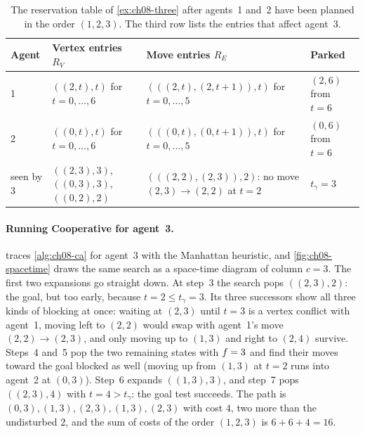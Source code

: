 \begin{table}[tb]
  \centering\small
  \caption{The reservation table of \cref{ex:ch08-three} after agents~1 and~2 have been
  planned in the order $(1,2,3)$. The third row lists the entries that affect agent~3.}
  \label{tab:ch08-table}
  \begin{tabular}{@{}lL{5.2cm}L{4.6cm}l@{}}
  \toprule
  Agent & Vertex entries $R_V$ & Move entries $R_E$ & Parked \\
   & $((2,t), t)$ for $t = 0, \dots, 6$ & $(((2,t),(2,t{+}1)), t)$ for $t = 0, \dots, 5$ & $(2,6)$ from $t = 6$ \\
  2 & $((0,t), t)$ for $t = 0, \dots, 6$ & $(((0,t),(0,t{+}1)), t)$ for $t = 0, \dots, 5$ & $(0,6)$ from $t = 6$ \\
  \midrule
  seen by 3 & $((2,3), 3)$, $((0,3), 3)$, $((0,2), 2)$ & $(((2,2),(2,3)), 2)$: no move $(2,3) \to (2,2)$ at $t = 2$ & $t_\gamma = 3$ \\
  \bottomrule
  \end{tabular}
\end{table}

\paragraph{Running Cooperative \astar for agent~3.}  traces
\cref{alg:ch08-ca} for agent~3 with the Manhattan heuristic, and
\cref{fig:ch08-spacetime} draws the same search as a space-time diagram of column
$c = 3$. The first two expansions go straight down. At step~3 the search pops
$((2,3), 2)$: the goal, but too early, because $t = 2 \le t_\gamma = 3$. Its three
successors show all three kinds of blocking at once: waiting at $(2,3)$ until $t = 3$
is a vertex conflict with agent~1, moving left to $(2,2)$ would swap with agent~1's
move $(2,2) \to (2,3)$, and only moving up to $(1,3)$ and right to $(2,4)$ survive.
Steps~4 and~5 pop the two remaining states with $f = 3$ and find their moves
toward the goal blocked as well (moving up from $(1,3)$ at $t = 2$ runs into agent~2 at $(0,3)$). Step~6 expands
$((1,3), 3)$, and step~7 pops $((2,3), 4)$ with $t = 4 > t_\gamma$: the goal test succeeds.
The path is $(0,3), (1,3), (2,3), (1,3), (2,3)$ with cost $4$, two more than the
undisturbed $2$, and the sum of costs of the order $(1,2,3)$ is $6 + 6 + 4 = 16$.

